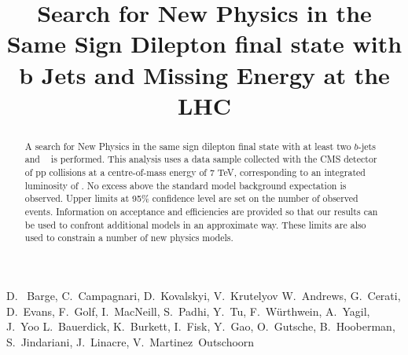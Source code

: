 \documentclass{cmspaper}
\begin{document}
%
\begin{titlepage}
\title{Search for New Physics in the Same Sign Dilepton final state with b Jets and Missing Energy at the LHC}

  \begin{Authlist}
    D.~ Barge, C.~Campagnari, D.~Kovalskyi, V.~Krutelyov
    W.~Andrews, G.~Cerati, D.~Evans, F.~Golf, I.~MacNeill, S.~Padhi, Y.~Tu, F.~W\"urthwein, A.~Yagil, J.~Yoo
    L.~Bauerdick, K.~Burkett, I.~Fisk, Y.~Gao, O.~Gutsche, B.~Hooberman, S.~Jindariani, J.~Linacre,
    V.~Martinez~Outschoorn
  \end{Authlist}

\begin{abstract}
A search for New Physics in the same sign dilepton final state with at least two $b$-jets 
and \met~ is performed. 
This analysis uses a data sample collected with the CMS detector
of pp collisions at a centre-of-mass energy of 7 TeV, corresponding to an integrated
luminosity of \intLumi. 
No excess above the standard model background expectation is observed.
Upper limits at 95\% confidence level are set on the number of observed events.
Information on acceptance and efficiencies are provided so that our 
results can be used to confront additional models in an approximate way.
These limits are also 
used to constrain a number of new physics models.
\end{abstract}
\end{titlepage}


%
%











\clearpage


\clearpage
\appendix



\end{document}
